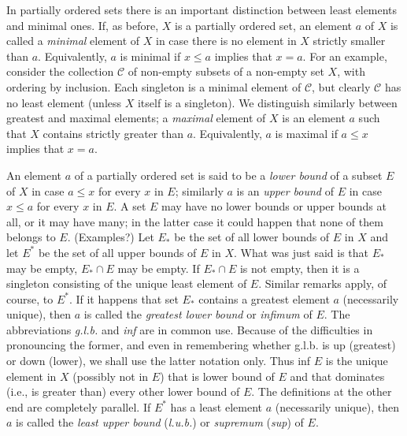 In partially ordered sets there is an important distinction between least elements and minimal ones. If, as before, $X$ is a partially ordered set, an element $a$ of $X$ is called a \textit{minimal} element of $X$ in case there is no element in $X$ strictly smaller than $a$. Equivalently, $a$ is minimal if $x \le a$ implies that $x = a$. For an example, consider the collection $\mathcal{C}$ of non-empty subsets of a non-empty set $X$, with ordering by inclusion. Each singleton is a minimal element of $\mathcal{C}$, but clearly $\mathcal{C}$ has no least element (unless $X$ itself is a singleton). We distinguish similarly between greatest and maximal elements; a \textit{maximal} element of $X$ is an element $a$ such that $X$ contains strictly greater than $a$. Equivalently, $a$ is maximal if $a \le x$ implies that $x = a$.
 
An element $a$ of a partially ordered set is said to be a \textit{lower bound} of a subset $E$ of $X$ in case $a \le x$ for every $x$ in $E$; similarly $a$ is an \textit{upper bound} of $E$ in case $x \le a$ for every $x$ in $E$. A set $E$ may have no lower bounds or upper bounds at all, or it may have many; in the latter case it could happen that none of them belongs to $E$. (Examples?) Let $E_{*}$ be the set of all lower bounds of $E$ in $X$ and let $E^{*}$ be the set of all upper bounds of $E$ in $X$. What was just said is that $E_{*}$ may be empty, $E_{*} \cap E$ may be empty. If $E_{*} \cap E$ is not empty, then it is a singleton consisting of the unique least element of $E$. Similar remarks apply, of course, to $E^{*}$. If it happens that set $E_{*}$ contains a greatest element $a$ (necessarily unique), then $a$ is called the \textit{greatest lower bound} or \textit{infimum} of $E$. The abbreviations \textit{g.l.b.} and \textit{inf} are in common use. Because of the difficulties in pronouncing the former, and even in remembering whether g.l.b. is up (greatest) or down (lower), we shall use the latter notation only. Thus inf $E$ is the unique element in $X$ (possibly not in $E$) that is lower bound of $E$ and that dominates (i.e., is greater than) every other lower bound of $E$. The definitions at the other end are completely parallel. If $E^{*}$ has a least element $a$ (necessarily unique), then $a$ is called the \textit{least upper bound} (\textit{l.u.b.}) or \textit{supremum} (\textit{sup}) of $E$. 

